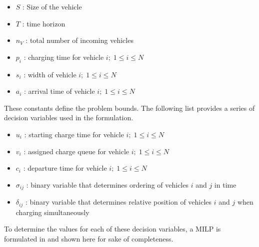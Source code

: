 \documentclass[utf8]{FrontiersinHarvard}
\let\cite\citep                                                                 %
\begin{document}
\begin{itemize}
	\item $S$   : Size of the vehicle
	\item $T$   : time horizon
	\item $n_V$ : total number of incoming vehicles
	\item $p_i$ : charging time for vehicle $i;\; 1 \leq i \leq N$
	\item $s_i$ : width of vehicle $i;\; 1 \leq i \leq N$
	\item $a_i$ : arrival time of vehicle $i;\; 1 \leq i \leq N$
\end{itemize}

These constants define the problem bounds. The following list provides a series of decision variables used in the
formulation.

\begin{itemize}
    \item $u_i$    : starting charge time for vehicle $i;\; 1 \leq i \leq N$
    \item $v_i$    : assigned charge queue for vehicle $i;\; 1 \leq i \leq N$
    \item $c_i$    : departure time for vehicle $i;\; 1 \leq i \leq N$
    \item $\sigma_{ij}$ : binary variable that determines ordering of vehicles $i$ and $j$ in time
    \item $\delta_{ij}$ : binary variable that determines relative position of vehicles $i$ and $j$ when charging simultaneously
\end{itemize}

To determine the values for each of these decision variables, a MILP is formulated in \cite{Qarebagh2019} and shown
here for sake of completeness.
\end{document}
